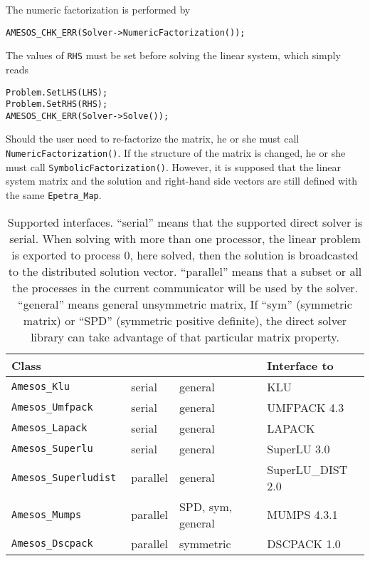 \documentclass[11pt]{SANDreport}
\begin{document}
The numeric factorization is performed by
\begin{verbatim}
AMESOS_CHK_ERR(Solver->NumericFactorization());
\end{verbatim}

The values of \verb!RHS! must be set before solving the linear system, which
simply reads
\begin{verbatim}
Problem.SetLHS(LHS);
Problem.SetRHS(RHS);
AMESOS_CHK_ERR(Solver->Solve());
\end{verbatim}

Should the user need to re-factorize the matrix, he or she must call
\verb!NumericFactorization()!. If the structure of the matrix is changed,
he or she must call \verb!SymbolicFactorization()!. However, it is supposed
that the linear system matrix and the solution and right-hand side vectors
are still defined with the same \verb!Epetra_Map!.

\begin{table}[tbhp]
  \centering
  \begin{tabular}{| l | l l l | }
    \hline
    Class &   &  & Interface to \\
    \hline
    \tt Amesos\_Klu          & serial   & general & KLU \\
    \tt Amesos\_Umfpack      & serial   & general & UMFPACK 4.3 \\
    \tt Amesos\_Lapack       & serial   & general & LAPACK \\
    \tt Amesos\_Superlu      & serial   & general & SuperLU 3.0 \\
    \tt  Amesos\_Superludist & parallel & general & SuperLU\_DIST 2.0 \\
    \tt Amesos\_Mumps        & parallel & SPD, sym, general & MUMPS 4.3.1 \\
    \tt Amesos\_Dscpack      & parallel & symmetric & DSCPACK 1.0 \\
    \hline
  \end{tabular}
  \caption{Supported interfaces. ``serial'' means that the supported
    direct solver is serial. When solving with 
    more than one processor, the linear problem is exported to process
    0, here solved, then the solution is broadcasted to the distributed
    solution 
    vector. ``parallel'' means that a subset or all the processes in the current
    communicator will be used by the solver. ``general'' means general
    unsymmetric 
    matrix, If ``sym'' (symmetric matrix) or  ``SPD'' (symmetric
    positive definite), the direct solver library can take advantage of
    that particular matrix property.}
  \label{tab:classes}
\end{table}
\end{document}
